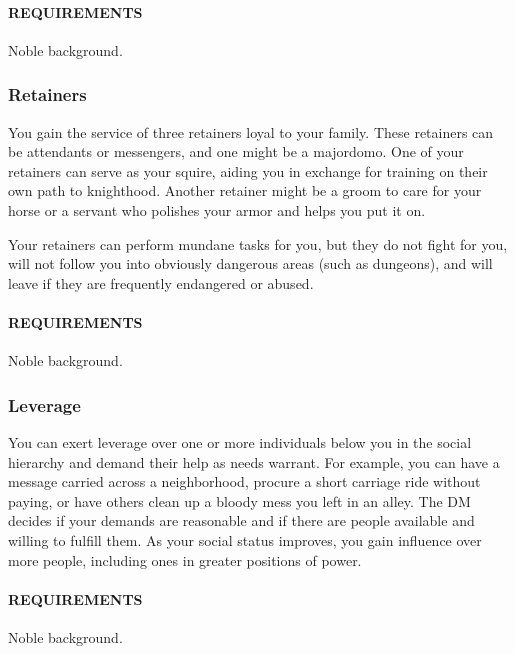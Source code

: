    \paragraph{REQUIREMENTS} Noble background.

    \subsubsection{Retainers} \label{feat::retainers}
    You gain the service of three retainers loyal to your family.
    These retainers can be attendants or messengers, and one might be a majordomo.
    One of your retainers can serve as your squire, aiding you in exchange for training on their own path to knighthood.
    Another retainer might be a groom to care for your horse or a servant who polishes your armor and helps you put it on.

    Your retainers can perform mundane tasks for you, but they do not fight for you, will not follow you into obviously dangerous areas (such as dungeons), and will leave if they are frequently endangered or abused.
    \paragraph{REQUIREMENTS} Noble background.

    \subsubsection{Leverage} \label{feat::leverage}
    You can exert leverage over one or more individuals below you in the social hierarchy and demand their help as needs warrant.
    For example, you can have a message carried across a neighborhood, procure a short carriage ride without paying, or have others clean up a bloody mess you left in an alley.
    The DM decides if your demands are reasonable and if there are people available and willing to fulfill them.
    As your social status improves, you gain influence over more people, including ones in greater positions of power.
    \paragraph{REQUIREMENTS} Noble background.

